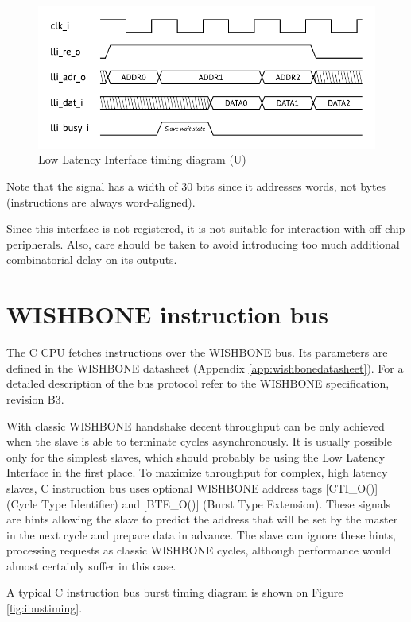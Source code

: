 \documentclass[a4paper,12pt,twoside,extrafontsizes]{memoir}
\begin{document}
\begin{figure}[htbp]
	\centering
	\includegraphics[scale=1]{images/llitiming.pdf}
	\caption{Low Latency Interface timing diagram (\lxp{}U)}
	\label{fig:llitiming}
\end{figure}

Note that the  signal has a width of 30 bits since it addresses words, not bytes (instructions are always word-aligned).

Since this interface is not registered, it is not suitable for interaction with off-chip peripherals. Also, care should be taken to avoid introducing too much additional combinatorial delay on its outputs.

\section{WISHBONE instruction bus}

The \lxp{}C CPU fetches instructions over the WISHBONE bus. Its parameters are defined in the WISHBONE datasheet (Appendix \ref{app:wishbonedatasheet}). For a detailed description of the bus protocol refer to the WISHBONE specification, revision B3.

With classic WISHBONE handshake decent throughput can be only achieved when the slave is able to terminate cycles asynchronously. It is usually possible only for the simplest slaves, which should probably be using the Low Latency Interface in the first place. To maximize throughput for complex, high latency slaves, \lxp{}C instruction bus uses optional WISHBONE address tags [CTI\_O()] (Cycle Type Identifier) and [BTE\_O()] (Burst Type Extension). These signals are hints allowing the slave to predict the address that will be set by the master in the next cycle and prepare data in advance. The slave can ignore these hints, processing requests as classic WISHBONE cycles, although performance would almost certainly suffer in this case.

A typical \lxp{}C instruction bus burst timing diagram is shown on Figure \ref{fig:ibustiming}.
\end{document}
